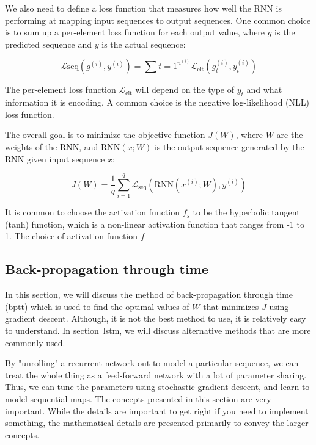     We also need to define a loss function that measures how well the RNN is performing at mapping input sequences to output sequences. One common choice is to sum up a per-element loss function for each output value, where $g$ is the predicted sequence and $y$ is the actual sequence:
    
    \begin{equation}
    \mathcal{L}{\text{seq}}\left(g^{(i)}, y^{(i)}\right) = \sum{t = 1}^{n^{(i)}}\mathcal{L}_\text{elt}\left(g_t^{(i)}, y_t^{(i)}\right)
    \end{equation}
    
    The per-element loss function $\mathcal{L}_\text{elt}$ will depend on the type of $y_t$ and what information it is encoding. A common choice is the negative log-likelihood (NLL) loss function.
    
    The overall goal is to minimize the objective function $J(W)$, where $W$ are the weights of the RNN, and $\text{RNN}(x; W)$ is the output sequence generated by the RNN given input sequence $x$:
    
    \begin{equation}
    J(W) = \frac{1}{q} \sum_{i = 1}^q\mathcal{L}_{\text{seq}}\left( \text{RNN}(x^{(i)};W), y^{(i)}\right)
    \end{equation}
    
    It is common to choose the activation function $f_s$ to be the hyperbolic tangent (tanh) function, which is a non-linear activation function that ranges from -1 to 1. The choice of activation function $f$

    \subsection{Back-propagation through time}
        \label{sec:bptt}
        
        In this section, we will discuss the method of back-propagation through time ({\sc bptt}) which is used to find the optimal values of $W$ that minimizes $J$ using gradient descent. Although, it is not the best method to use, it is relatively easy to understand. In section~lstm, we will discuss alternative methods that are more commonly used.
        
        \begin{concept}
        By "unrolling" a recurrent network out to model a particular sequence, we can treat the whole thing as a feed-forward network with a lot of parameter sharing. Thus, we can tune the parameters using stochastic gradient descent, and learn to model sequential maps. The concepts presented in this section are very important. While the details are important to get right if you need to implement something, the mathematical details are presented primarily to convey the larger concepts.
        \end{concept}
        

